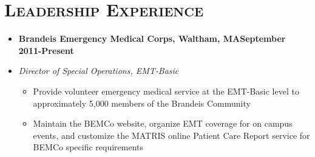 \documentclass[10pt, oneside]{article}
\newcommand{\lr}[2]{#1\hfill#2}
\newenvironment{ressection}[1]{
  \section{\normalsize \scshape \selectfont #1 \normalfont}
  \vspace{-4pt}
  \begin{itemize} \itemsep-2pt
  }{
  \end{itemize}
  \vspace{-20pt}
}
\newenvironment{resitem}[4]{
\item[] \lr{\bfseries \selectfont #1\normalfont, #2} {#3}
\item[] \textsl{#4}
  \vspace{-4pt}
  \begin{itemize} \itemsep-2pt
  }{
  \end{itemize}
}
\begin{document}
\begin{ressection}{Leadership Experience}
  \begin{resitem}{Brandeis Emergency Medical Corps}{Waltham, MA}{September 2011-Present}{Director of Special Operations, EMT-Basic}
  \item Provide volunteer emergency medical service at the EMT-Basic level to approximately 5,000 members of the Brandeis Community
  \item Maintain the BEMCo website, organize EMT coverage for on campus events, and customize the MATRIS online Patient Care Report service for BEMCo specific requirements
  \end{resitem}
\end{ressection}
\end{document}

